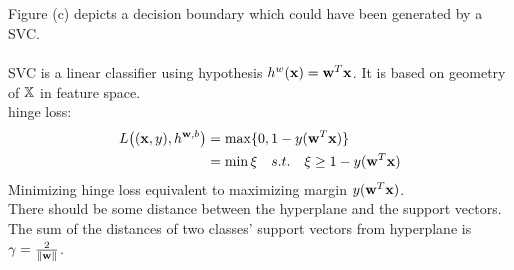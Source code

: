 \documentclass[article,11pt]{article}
\begin{document}
	\begin{figure}[ht!]
		\begin{center}
		\end{center}
	\end{figure}
\\ \\
Figure (c) depicts a decision boundary which could have been generated by a SVC.\\ \\
SVC is a linear classifier using hypothesis $h^{w}({\bf x})={\bf w}^{T}{\bf x}$. It is based on geometry of $\mathbb{X}$ in feature space.\\
 hinge loss:
\begin{equation}
\begin{aligned}
L\big(({\bf x},y),h^{{\bf w},b}\big) & = \max\{0,1-y({\bf w}^{T}{\bf x})\} \\
						   & = \min \xi \quad s.t.\quad \xi \ge 1- y({\bf w}^{T}{\bf x})
\end{aligned}	
\end{equation}
Minimizing hinge loss equivalent to maximizing margin $y({\bf w}^{T}{\bf x})$.\\
There should be some distance between the hyperplane and the support vectors. The sum of the distances of two classes' support vectors from hyperplane is $\gamma = \frac{2}{\Vert{\bf w} \Vert}$. 
\end{document}
